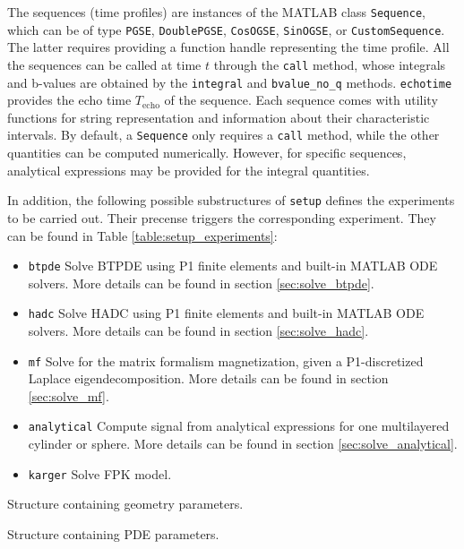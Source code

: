 \documentclass[a4paper]{article}
\begin{document}
The sequences (time profiles) are instances of the MATLAB class \verb+Sequence+, which can be of type \verb+PGSE+, \verb+DoublePGSE+, \verb+CosOGSE+, \verb+SinOGSE+, or \verb+CustomSequence+. The latter requires providing a function handle representing the time profile. All the sequences can be called at time $t$ through the \verb+call+ method, whose integrals and b-values are obtained by the \verb+integral+ and \verb+bvalue_no_q+ methods. \verb+echotime+ provides the echo time $T_\text{echo}$ of the sequence. Each sequence comes with utility functions for string representation and information about their characteristic intervals. By default, a \verb+Sequence+ only requires a \verb+call+ method, while the other quantities can be computed numerically. However, for specific sequences, analytical expressions may be provided for the integral quantities.

In addition, the following possible substructures of \verb+setup+ defines the experiments to be carried out. Their precense triggers the corresponding experiment. They can be found in Table \ref{table:setup_experiments}:
\begin{itemize}
    \item \verb+btpde+ Solve BTPDE using P1 finite elements and built-in MATLAB ODE solvers. More details can be found in section \ref{sec:solve_btpde}.
    \item \verb+hadc+ Solve HADC using P1 finite elements and built-in MATLAB ODE solvers. More details can be found in section \ref{sec:solve_hadc}.
    \item \verb+mf+ Solve for the matrix formalism magnetization, given a P1-discretized Laplace eigendecomposition. More details can be found in section \ref{sec:solve_mf}.
    \item \verb+analytical+ Compute signal from analytical expressions for one multilayered cylinder or sphere. More details can be found in section \ref{sec:solve_analytical}.
    \item \verb+karger+ Solve FPK model.
\end{itemize}

\begin{table}
    \centering
    
    \caption{Structure containing geometry parameters.}
    \label{table:setup_geometry}
\end{table}

\begin{table}
    \centering
    
    \caption{Structure containing PDE parameters.}
    \label{table:setup_pde}
\end{table}
\end{document}
